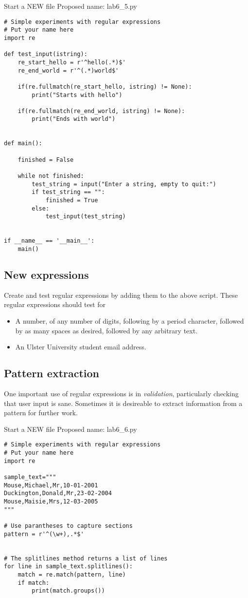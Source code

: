 \documentclass[12pt,oneside]{cttutorial}
\begin{document}
\alert{Start a NEW file}
Proposed name: lab6\_5.py
\begin{lstlisting}
# Simple experiments with regular expressions
# Put your name here
import re

def test_input(istring):
    re_start_hello = r'^hello(.*)$'
    re_end_world = r'^(.*)world$'

    if(re.fullmatch(re_start_hello, istring) != None):
        print("Starts with hello")

    if(re.fullmatch(re_end_world, istring) != None):
        print("Ends with world")
 

def main():

    finished = False

    while not finished:
        test_string = input("Enter a string, empty to quit:")
        if test_string == "":
            finished = True
        else:
            test_input(test_string)


if __name__ == '__main__':
    main()
\end{lstlisting}

\subsection{New expressions}

Create and test regular expressions by adding them to the above script. These regular expressions should test for

\begin{itemize}
\item A number, of any number of digits, following by a period character, followed by as many spaces as desired, followed by any arbitrary text.
\item An Ulster University student email address.
\end{itemize}

\subsection{Pattern extraction}

One important use of regular expressions is in \emph{validation}, particularly checking that user input is sane. Sometimes it is desireable to extract information from a pattern for further work.


\alert{Start a NEW file}
Proposed name: lab6\_6.py
\begin{lstlisting}
# Simple experiments with regular expressions
# Put your name here
import re

sample_text="""
Mouse,Michael,Mr,10-01-2001
Duckington,Donald,Mr,23-02-2004
Mouse,Maisie,Mrs,12-03-2005
"""

# Use parantheses to capture sections
pattern = r'^(\w+),.*$'


# The splitlines method returns a list of lines
for line in sample_text.splitlines():
    match = re.match(pattern, line)
    if match:
        print(match.groups())
\end{lstlisting}
\end{document}
